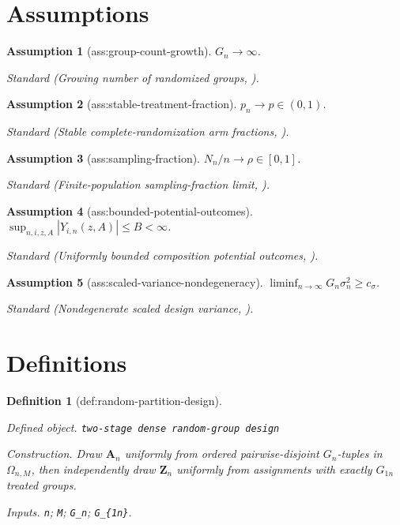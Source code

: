 \documentclass{article}
\newtheorem{assumption}{Assumption}
\newtheorem{definition}{Definition}
\begin{document}
\section{Assumptions}

\begin{assumption}[ass:group-count-growth]\label{ass:group-count-growth}
\(G_n\to\infty\).
\par\smallskip\noindent\emph{Standard} (Growing number of randomized groups, \cite{FuSamiiWang2026}).
\end{assumption}

\begin{assumption}[ass:stable-treatment-fraction]\label{ass:stable-treatment-fraction}
\(p_n\to p\in(0,1)\).
\par\smallskip\noindent\emph{Standard} (Stable complete-randomization arm fractions, \cite{LiDing2017}).
\end{assumption}

\begin{assumption}[ass:sampling-fraction]\label{ass:sampling-fraction}
\(N_n/n\to\rho\in[0,1]\).
\par\smallskip\noindent\emph{Standard} (Finite-population sampling-fraction limit, \cite{Ohlsson1989}).
\end{assumption}

\begin{assumption}[ass:bounded-potential-outcomes]\label{ass:bounded-potential-outcomes}
\(\sup_{n,i,z,A}|Y_{i,n}(z,A)|\le B<\infty\).
\par\smallskip\noindent\emph{Standard} (Uniformly bounded composition potential outcomes, \cite{FuSamiiWang2026}).
\end{assumption}

\begin{assumption}[ass:scaled-variance-nondegeneracy]\label{ass:scaled-variance-nondegeneracy}
\(\liminf_{n\to\infty}G_n\sigma_n^2\ge c_\sigma\).
\par\smallskip\noindent\emph{Standard} (Nondegenerate scaled design variance, \cite{LiDing2017}).
\end{assumption}

\section{Definitions}

\begin{definition}[def:random-partition-design]\label{def:random-partition-design}
\par\smallskip\noindent\emph{Defined object.} \texttt{two-\allowbreak{}stage dense random-\allowbreak{}group design}
\par\smallskip\noindent\emph{Construction.} Draw \(\mathbf A_n\) uniformly from ordered pairwise-disjoint \(G_n\)-tuples in \(\Omega_{n,M}\), then independently draw \(\mathbf Z_n\) uniformly from assignments with exactly \(G_{1n}\) treated groups.
\par\smallskip\noindent\emph{Inputs.} \texttt{n}; \texttt{M}; \texttt{G\_\allowbreak{}n}; \texttt{G\_\allowbreak{}\{1n\}\allowbreak{}}.
\end{definition}
\end{document}
